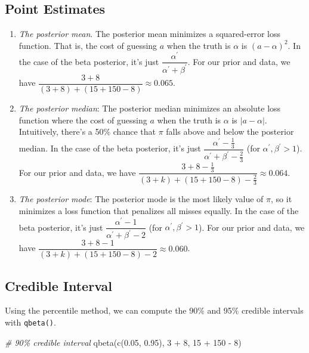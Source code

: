 \documentclass[
]{book}
\newenvironment{Shaded}{\begin{snugshade}}{\end{snugshade}}
\newcommand{\CommentTok}[1]{\textcolor[rgb]{0.56,0.35,0.01}{\textit{#1}}}
\newcommand{\DecValTok}[1]{\textcolor[rgb]{0.00,0.00,0.81}{#1}}
\newcommand{\FloatTok}[1]{\textcolor[rgb]{0.00,0.00,0.81}{#1}}
\newcommand{\FunctionTok}[1]{\textcolor[rgb]{0.00,0.00,0.00}{#1}}
\newcommand{\NormalTok}[1]{#1}
\newcommand{\SpecialCharTok}[1]{\textcolor[rgb]{0.00,0.00,0.00}{#1}}
\providecommand{\tightlist}{%
  \setlength{\itemsep}{0pt}\setlength{\parskip}{0pt}}
\begin{document}
\hypertarget{point-estimates}{%
\subsection{Point Estimates}\label{point-estimates}}

\begin{enumerate}
\def\labelenumi{\arabic{enumi}.}
\tightlist
\item
  \emph{The posterior mean}. The posterior mean minimizes a
  squared-error loss function. That is, the cost of guessing \(a\) when
  the truth is \(\alpha\) is \((a - \alpha)^2\). In the case of the beta
  posterior, it's just
  \(\dfrac{\alpha^\prime}{\alpha^\prime + \beta^\prime}\). For our prior
  and data, we have
  \(\dfrac{3 + 8}{(3 + 8) + (15 + 150 - 8)} \approx 0.065\).
\item
  \emph{The posterior median}: The posterior median minimizes an
  absolute loss function where the cost of guessing \(a\) when the truth
  is \(\alpha\) is \(|a - \alpha|\). Intuitively, there's a 50\% chance
  that \(\pi\) falls above and below the posterior median. In the case
  of the beta posterior, it's just
  \(\dfrac{\alpha^\prime - \frac{1}{3}}{\alpha^\prime + \beta^\prime - \frac{2}{3}}\)
  (for \(\alpha^\prime, \beta^\prime > 1\)). For our prior and data, we
  have
  \(\dfrac{3 + 8 -\frac{1}{3}}{(3 + k) + (15 + 150 - 8) - \frac{2}{3}} \approx 0.064\).
\item
  \emph{The posterior mode}: The posterior mode is the most likely value
  of \(\pi\), so it minimizes a loss function that penalizes all misses
  equally. In the case of the beta posterior, it's just
  \(\dfrac{\alpha^\prime - 1}{\alpha^\prime + \beta^\prime - 2}\) (for
  \(\alpha^\prime, \beta^\prime > 1\)). For our prior and data, we have
  \(\dfrac{3 + 8 - 1}{(3 + k) + (15 + 150 - 8) - 2} \approx 0.060\).
\end{enumerate}

\hypertarget{credible-interval}{%
\subsection{Credible Interval}\label{credible-interval}}

Using the percentile method, we can compute the 90\% and 95\% credible
intervals with \texttt{qbeta()}.

\begin{Shaded}
\begin{Highlighting}[]
\CommentTok{\# 90\% credible interval}
\FunctionTok{qbeta}\NormalTok{(}\FunctionTok{c}\NormalTok{(}\FloatTok{0.05}\NormalTok{, }\FloatTok{0.95}\NormalTok{), }\DecValTok{3} \SpecialCharTok{+} \DecValTok{8}\NormalTok{, }\DecValTok{15} \SpecialCharTok{+} \DecValTok{150} \SpecialCharTok{{-}} \DecValTok{8}\NormalTok{)}
\end{Highlighting}
\end{Shaded}
\end{document}
